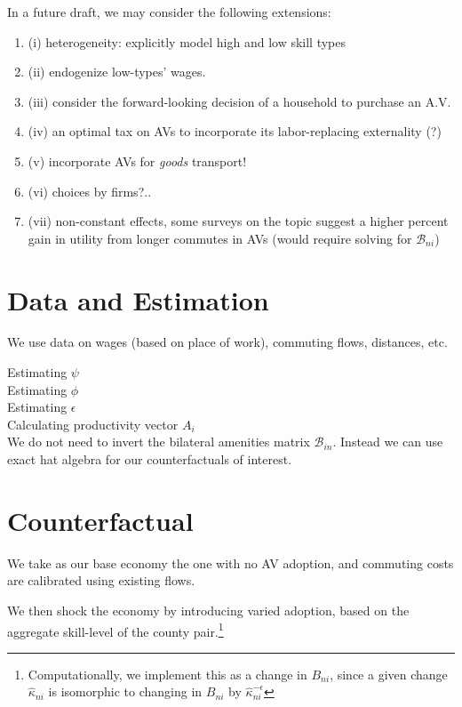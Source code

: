 \documentclass{article}
\begin{document}
In a future draft, we may consider the following extensions: 
\begin{enumerate}
\item  (i) heterogeneity: explicitly model high and low skill types
 \item (ii) endogenize low-types' wages.
\item (iii) consider the forward-looking decision of a household to purchase an A.V.
\item (iv) an optimal tax on AVs to incorporate its labor-replacing externality (?)
\item (v) incorporate AVs for \textit{goods} transport!
\item (vi) choices by firms?..
\item (vii) non-constant effects, some surveys on the topic suggest a higher percent gain in utility from longer commutes in AVs (would require solving for $\mathcal{B}_{ni}$)
\end{enumerate}



\section{Data and Estimation}
We use data on wages (based on place of work), commuting flows, distances, etc.



Estimating $\psi$ \\
Estimating $\phi$ \\ 
Estimating $\epsilon$ \\
Calculating productivity vector $A_i$ \\


We do not need to invert the bilateral amenities matrix $\mathcal{B}_{in}$. Instead we can use exact hat algebra for our counterfactuals of interest. 




\section{Counterfactual}

We take as our base economy the one with no AV adoption, and commuting costs are calibrated using existing flows.

We then shock the economy by introducing varied adoption, based on the aggregate skill-level of the county pair.\footnote{Computationally, we implement this as a change in  $B_{ni}$, since a given change $\hat \kappa_{ni}$ is isomorphic to changing in $B_{ni}$ by $\hat \kappa_{ni}^{-\epsilon}$}
\end{document}
